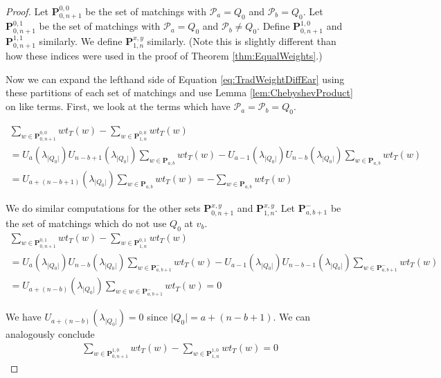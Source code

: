 \documentclass[12pt]{article}
\theoremstyle{remark}
\newcommand*{\pathset}[2]{\mathbf{P}_{#1,#2}}
\newcommand*{\poly}[1]{\mathcal{P}_{#1}}
\begin{document}
\begin{proof}
 Let $\pathset{0}{n+1}^{0,0}$ be the set of matchings with $\poly{a} = Q_0$ and $\poly{b} = Q_0$. Let $\pathset{0}{n+1}^{0,1}$ be the set of matchings with $\poly{a} = Q_0$ and $\poly{b} \neq Q_0$. Define $\pathset{0}{n+1}^{1,0}$ and $\pathset{0}{n+1}^{1,1}$ similarly.   We define $\pathset{1}{n}^{x,y}$ similarly. (Note this is slightly different than how these indices were used in the proof of Theorem \ref{thm:EqualWeights}.)

Now we can expand the lefthand side of Equation \ref{eq:TradWeightDiffEar} using these partitions of each set of matchings and use Lemma \ref{lem:ChebyshevProduct} on like terms. First, we look at the terms which have $\poly{a} = \poly{b} = Q_0$. 

\begin{align*}
\sum_{w \in \pathset{0}{n+1}^{0,0}} wt_T(w) - \sum_{w \in \pathset{1}{n}^{0,0}} wt_T(w) \\= U_a(\lambda_{\vert Q_0\vert})U_{n-b+1}(\lambda_{\vert Q_0\vert}) \sum_{w \in \pathset{a}{b}} wt_T(w) - U_{a-1}(\lambda_{\vert Q_0\vert})U_{n-b}(\lambda_{\vert Q_0\vert}) \sum_{w \in \pathset{a}{b}} wt_T(w) \\
= U_{a+(n-b+1)}(\lambda_{\vert Q_0\vert})\sum_{w \in \pathset{a}{b}}wt_T(w) = - \sum_{w \in \pathset{a}{b}}wt_T(w)
\end{align*}


We do similar computations for the other sets $\pathset{0}{n+1}^{x,y}$ and $\pathset{1}{n}^{x,y}$. Let $\pathset{a}{b+1}^-$ be the set of matchings which do not use $Q_0$ at $v_b$. 
\begin{align*}
 \sum_{w \in \pathset{0}{n+1}^{0,1}} wt_T(w) - \sum_{w \in \pathset{1}{n}^{0,1}} wt_T(w) \\= U_a(\lambda_{\vert Q_0\vert})U_{n-b}(\lambda_{\vert Q_0\vert}) \sum_{w \in \pathset{a}{b+1}^-} wt_T(w) - U_{a-1}(\lambda_{\vert Q_0\vert})U_{n-b-1}(\lambda_{\vert Q_0\vert}) \sum_{w \in \pathset{a}{b+1}^-} wt_T(w) \\
= U_{a+(n-b)}(\lambda_{\vert Q_0\vert})\sum_{w \in w \in \pathset{a}{b+1}^-}wt_T(w) = 0
\end{align*}

We have $U_{a+(n-b)}(\lambda_{\vert Q_0 \vert}) = 0$ since $\vert Q_0 \vert = a + (n-b + 1)$. We can analogously conclude \begin{align*}
  \sum_{w \in \pathset{0}{n+1}^{1,0}} wt_T(w) - \sum_{w \in \pathset{1}{n}^{1,0}} wt_T(w) = 0   
\end{align*}


\end{proof}
\end{document}
